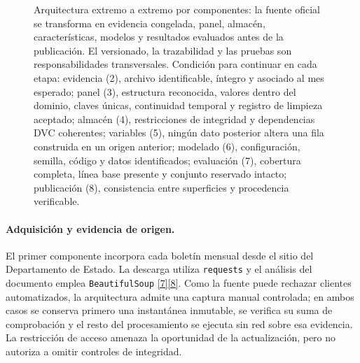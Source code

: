 \documentclass[12pt,letterpaper]{report}
\newcommand{\cita}[1]{\hyperref[bib:#1]{[#1]}}
\begin{document}
\begin{figure}[htbp]
\caption[Arquitectura general de VisaPredict AI]{Arquitectura extremo a extremo por
componentes: la fuente oficial se transforma en evidencia congelada, panel, almacén,
características, modelos y resultados evaluados antes de la publicación. El versionado,
la trazabilidad y las pruebas son responsabilidades transversales. Condición para continuar
en cada etapa: evidencia (2), archivo identificable, íntegro y asociado al mes esperado; panel
(3), estructura reconocida, valores dentro del dominio, claves únicas, continuidad temporal y
registro de limpieza aceptado; almacén (4), restricciones de integridad y dependencias DVC
coherentes; variables (5), ningún dato posterior altera una fila construida en un origen
anterior; modelado (6), configuración, semilla, código y datos identificados; evaluación (7),
cobertura completa, línea base presente y conjunto reservado intacto; publicación (8),
consistencia entre superficies y procedencia verificable.}
\label{fig:arquitectura_a7}
\end{figure}

\paragraph{Adquisición y evidencia de origen.} El primer componente incorpora cada boletín
mensual desde el sitio del Departamento de Estado. La descarga utiliza \texttt{requests} y el
análisis del documento emplea \texttt{BeautifulSoup} \cita{7}\cita{8}. Como la fuente puede
rechazar clientes automatizados, la arquitectura admite una captura manual controlada; en ambos
casos se conserva primero una instantánea inmutable, se verifica su suma de comprobación y el
resto del procesamiento se ejecuta sin red sobre esa evidencia. La restricción de acceso amenaza
la oportunidad de la actualización, pero no autoriza a omitir controles de integridad.
\end{document}

